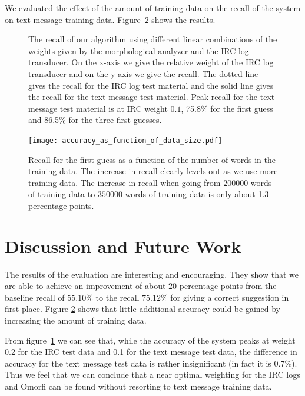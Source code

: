 \documentclass[a4paper,conference]{IEEEtran}
\begin{document}
We evaluated the effect of the amount of training data on the recall
of the system on text message training
data. Figure~\ref{fig:SaturationGraph} shows the results. 

\begin{figure}[!t]
\centerline{
\hfil
{}}
\caption{The recall of our algorithm using different linear combinations of the weights given by the morphological analyzer and the IRC log transducer. On the x-axis we give the relative weight of the IRC log transducer and on the y-axis we give the recall. The dotted line gives the recall for the IRC log test material and the solid line gives the recall for the text message test material. Peak recall for the text message test material is at IRC weight $0.1$, 75.8\% for the first guess and 86.5\% for the three first guesses.}
\label{fig:AccuraciesIRCMaterial}
\end{figure}

\begin{figure}[!t]
\begin{center}
\texttt{[image: accuracy\_as\_function\_of\_data\_size.pdf]}
\end{center}
\caption{Recall for the first guess as a function of the number of words in the training data. The increase in recall clearly levels out as we use more training data. The increase in recall when going from $200000$ words of training data to $350000$ words of training data is only about 1.3 percentage points.}
\label{fig:SaturationGraph}
\end{figure}

\section{Discussion and Future Work}
\label{sec:discussion}

The results of the evaluation are interesting and encouraging. They
show that we are able to achieve an improvement of about $20$
percentage points from the baseline recall of $55.10\%$ to the recall
$75.12\%$ for giving a correct suggestion in first place. Figure
\ref{fig:SaturationGraph} shows that little additional accuracy could be
gained by increasing the amount of training data.

From figure~\ref{fig:AccuraciesIRCMaterial} we can see that, while the
accuracy of the system peaks at weight 0.2 for the IRC test data and
0.1 for the text message test data, the difference in accuracy for the
text message test data is rather insignificant (in fact it is
0.7\%). Thus we feel that we can conclude that a near optimal
weighting for the IRC logs and Omorfi can be found without resorting
to text message training data.
\end{document}
